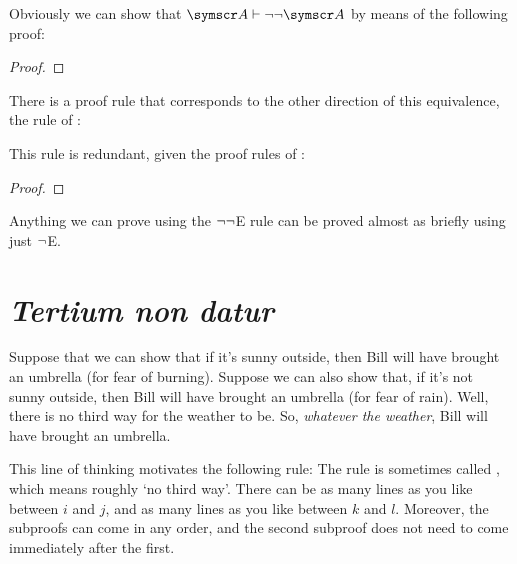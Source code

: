 Obviously we can show that $\meta{A} \proves \enot\enot\meta{A}$ by means of the following proof:
\begin{proof}
\open
{}
\close
{}	
\end{proof}

There is a proof rule that corresponds to the other direction of this equivalence, the rule of :


This rule is redundant, given the proof rules of \TFL: \begin{proof}
	\open
	\close
\end{proof}
Anything we can prove using the $\neg\neg$E rule can be proved almost as briefly using just $\neg$E.



\section{\emph{Tertium non datur}}

Suppose that we can show that if it's sunny outside, then Bill will have brought an umbrella (for fear of burning). Suppose we can also show that, if it's not sunny outside, then Bill will have brought an umbrella (for fear of rain). Well, there is no third way for the weather to be. So, \emph{whatever the weather}, Bill will have brought an umbrella. 

This line of thinking motivates the following rule:
The rule is sometimes called , which means roughly `no third way'. There can be as many lines as you like between $i$ and $j$, and as many lines as you like between $k$ and $l$. Moreover, the subproofs can come in any order, and the second subproof does not need to come immediately after the first.

